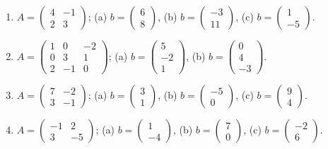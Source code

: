 \begin{enumerate}[label=\arabic*., leftmargin=*]
\item $A=\begin{pmatrix}4&-1\\2&3\end{pmatrix}$; \quad
(a) $b=\begin{pmatrix}6\\8\end{pmatrix}$, \quad
(b) $b=\begin{pmatrix}-3\\11\end{pmatrix}$, \quad
(c) $b=\begin{pmatrix}1\\-5\end{pmatrix}$.

\item $A=\begin{pmatrix}1&0&-2\\0&3&1\\2&-1&0\end{pmatrix}$; \quad
(a) $b=\begin{pmatrix}5\\-2\\1\end{pmatrix}$, \quad
(b) $b=\begin{pmatrix}0\\4\\-3\end{pmatrix}$.

\item $A=\begin{pmatrix}7&-2\\3&-1\end{pmatrix}$; \quad
(a) $b=\begin{pmatrix}3\\1\end{pmatrix}$, \quad
(b) $b=\begin{pmatrix}-5\\0\end{pmatrix}$, \quad
(c) $b=\begin{pmatrix}9\\4\end{pmatrix}$.

\item $A=\begin{pmatrix}-1&2\\3&-5\end{pmatrix}$; \quad
(a) $b=\begin{pmatrix}1\\-4\end{pmatrix}$, \quad
(b) $b=\begin{pmatrix}7\\0\end{pmatrix}$, \quad
(c) $b=\begin{pmatrix}-2\\6\end{pmatrix}$.


\end{enumerate}
